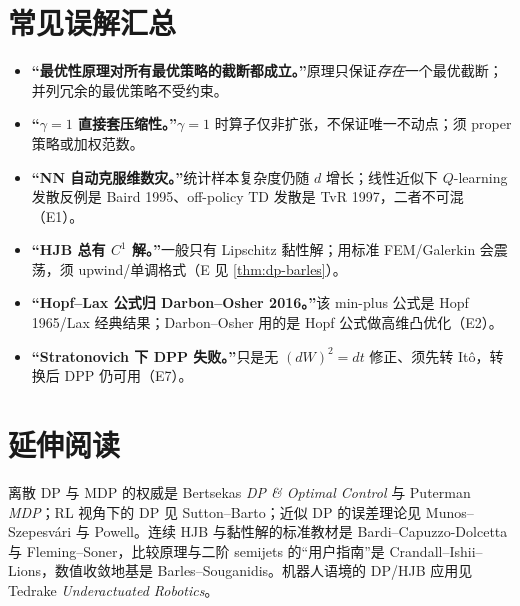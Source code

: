 \section*{常见误解汇总}
\begin{itemize}
  \item \textbf{“最优性原理对所有最优策略的截断都成立。”}\;原理只保证\emph{存在}一个最优截断；并列冗余的最优策略不受约束。
  \item \textbf{“$\gamma=1$ 直接套压缩性。”}\;$\gamma=1$ 时算子仅非扩张，不保证唯一不动点；须 proper 策略或加权范数。
  \item \textbf{“NN 自动克服维数灾。”}\;统计样本复杂度仍随 $d$ 增长；线性近似下 $Q$-learning 发散反例是 Baird 1995、off-policy TD 发散是 TvR 1997，二者不可混（E1）。
  \item \textbf{“HJB 总有 $C^1$ 解。”}\;一般只有 Lipschitz 黏性解；用标准 FEM/Galerkin 会震荡，须 upwind/单调格式（E 见 \cref{thm:dp-barles}）。
  \item \textbf{“Hopf--Lax 公式归 Darbon--Osher 2016。”}\;该 min-plus 公式是 Hopf 1965/Lax 经典结果；Darbon--Osher 用的是 Hopf 公式做高维凸优化（E2）。
  \item \textbf{“Stratonovich 下 DPP 失败。”}\;只是无 $(dW)^2=dt$ 修正、须先转 Itô，转换后 DPP 仍可用（E7）。
\end{itemize}

\section*{延伸阅读}
离散 DP 与 MDP 的权威是 Bertsekas \emph{DP \& Optimal Control}\cite{bertsekas2017dpoc1} 与 Puterman \emph{MDP}\cite{puterman1994mdp}；RL 视角下的 DP 见 Sutton--Barto\cite{sutton2018rl}；近似 DP 的误差理论见 Munos--Szepesvári\cite{munos2008finite} 与 Powell\cite{powell2011adp}。连续 HJB 与黏性解的标准教材是 Bardi--Capuzzo-Dolcetta\cite{bardi1997optimal} 与 Fleming--Soner\cite{flemingsoner2006}，比较原理与二阶 semijets 的“用户指南”是 Crandall--Ishii--Lions\cite{crandall1992users}，数值收敛地基是 Barles--Souganidis\cite{barles1991convergence}。机器人语境的 DP/HJB 应用见 Tedrake \emph{Underactuated Robotics}\cite{tedrake_underactuated}。

